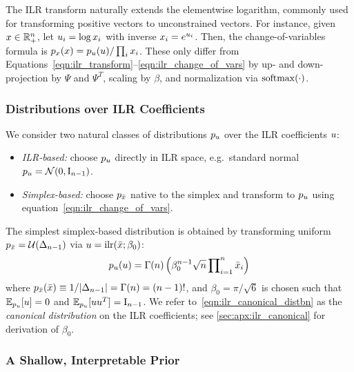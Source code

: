 The \gls*{ILR} transform naturally extends the elementwise logarithm, commonly used for transforming positive vectors to unconstrained vectors.
For instance, given $x \in \mathbb{R}_{+}^{n}$, let $u_i = \log x_i$ with inverse $x_i = e^{u_i}$.
Then, the change-of-variables formula is $p_{x}(x) = p_{u}(u) / \prod_{i} x_i$.
These only differ from Equations~\eqref{eqn:ilr_transform}--\eqref{eqn:ilr_change_of_vars} by up- and down-projection by $\Psi$ and $\Psi^T$, scaling by $\beta$, and normalization via $\Softmax{\cdot}$.

\subsubsection{Distributions over \gls*{ILR} Coefficients}\label{subsubsec:ilr_distributions}

We consider two natural classes of distributions $p_{u}$ over the \gls*{ILR} coefficients $u$:
\begin{itemize}
    \item \textit{\gls*{ILR}-based:} choose $p_{u}$ directly in \gls*{ILR} space, e.g.\ standard normal $p_{u} = \mathcal{N}(0, \mathrm{I}_{n-1})$.
    \item \textit{Simplex-based:} choose $p_{\bar{x}}$ native to the simplex and transform to $p_{u}$ using equation~\eqref{eqn:ilr_change_of_vars}.
\end{itemize}
The simplest simplex-based distribution is obtained by transforming uniform $p_{\bar{x}} = \mathcal{U}(\Delta_{n-1})$ via $\vv{u} = \ILR{\bar{\distbn}; \beta_{0}}$:
\begin{align}\label{eqn:ilr_canonical_distbn}
    p_{u}(u) = \Gamma(n) \left( \beta_{0}^{n-1} \sqrt{n} \prod\nolimits_{i=1}^{n} \bar{x}_{i} \right)
\end{align}
where $p_{\bar{x}}(\bar{x}) \equiv 1/|\Delta_{n-1}| = \Gamma(n) = (n-1)!$, and $\beta_{0} = \pi/\sqrt{6}$ is chosen such that $\mathbb{E}_{p_{u}}[u] = 0$ and $\mathbb{E}_{p_{u}}[uu^T] = \mathrm{I}_{n-1}$.
We refer to~\eqref{eqn:ilr_canonical_distbn} as the \textit{canonical distribution} on the \gls*{ILR} coefficients;
see \cref{sec:apx:ilr_canonical} for derivation of $\beta_{0}$.

\subsubsection{A Shallow, Interpretable Prior}\label{subsubsec:shallow_prior}

